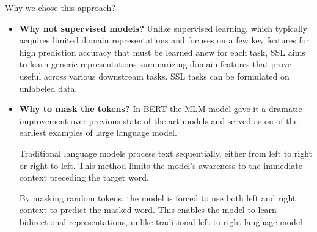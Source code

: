 \documentclass[10pt]{beamer}
\begin{document}
\begin{frame}{Why we chose this approach?}

    \begin{itemize}[<+->]
        \item \textbf{Why not supervised models?}
Unlike supervised learning, which typically acquires limited domain representations
and focuses on a few key features for high prediction accuracy that must be learned anew for each task, SSL aims
to learn generic representations summarizing domain features that prove useful across various downstream tasks.
SSL tasks can be formulated on unlabeled data.
        \item \textbf{Why to mask the tokens?}
            In BERT the MLM model gave it a dramatic improvement over previous state-of-the-art
            models and served as on of the earliest examples of large language
            model.

           Traditional language models process text sequentially, either from
           left to right or right to left. This method limits the model’s
           awareness to the immediate context preceding the target word.

           By masking random tokens, the model is forced to use both left and
           right context to predict the masked word. This enables the model to
           learn bidirectional representations, unlike traditional left-to-right
           language model

   \end{itemize}
\end{frame}
\end{document}

